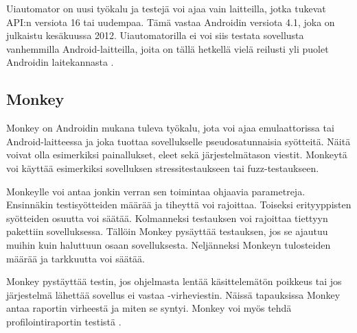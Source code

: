 Uiautomator on uusi työkalu ja testejä voi ajaa vain laitteilla, jotka tukevat API:n versiota 16 tai uudempaa. Tämä vastaa Androidin versiota 4.1, joka on julkaistu kesäkuussa 2012. Uiautomatorilla ei voi siis testata sovellusta vanhemmilla Android-laitteilla, joita on tällä hetkellä vielä reilusti yli puolet Androidin laitekannasta \cite{android}.

\subsection{Monkey}

Monkey on Androidin mukana tuleva työkalu, jota voi ajaa emulaattorissa tai Android-laitteessa ja joka tuottaa sovellukselle pseudosatunnaisia syötteitä. Näitä voivat olla esimerkiksi painallukset, eleet sekä järjestelmätason viestit. Monkeytä voi käyttää esimerkiksi sovelluksen stressitestaukseen tai fuzz-testaukseen.

Monkeylle voi antaa jonkin verran sen toimintaa ohjaavia parametreja. Ensinnäkin testisyötteiden määrää ja tiheyttä voi rajoittaa. Toiseksi erityyppisten syötteiden osuutta voi säätää. Kolmanneksi testauksen voi rajoittaa tiettyyn pakettiin sovelluksessa. Tällöin Monkey pysäyttää testauksen, jos se ajautuu muihin kuin haluttuun osaan sovelluksesta. Neljänneksi Monkeyn tulosteiden määrää ja tarkkuutta voi säätää.

Monkey pystäyttää testin, jos ohjelmasta lentää käsittelemätön poikkeus tai jos järjestelmä lähettää sovellus ei vastaa -virheviestin. Näissä tapauksissa Monkey antaa raportin virheestä ja miten se syntyi. Monkey voi myös tehdä profilointiraportin testistä \cite{android}.